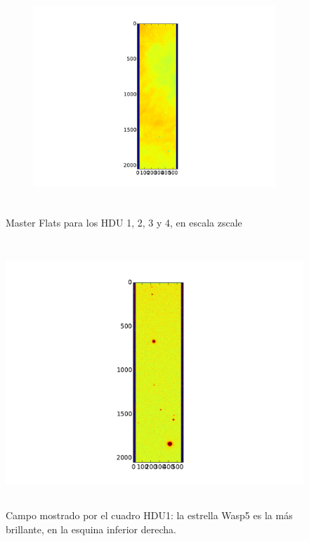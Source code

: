 \documentclass[a4paper, 11pt, spanish]{article}
\begin{document}
\begin{figure}[!ht]
\begin{subfigure}{.5\textwidth}
  \caption{}
  \label{fig:flat3}
\end{subfigure}%
\begin{subfigure}{.5\textwidth}
  \centering
  \includegraphics[width=10cm, height=8cm]{img/flats 4.pdf}
  \caption{}
  \label{fig:flat4}
\end{subfigure}
\caption{Master Flats para los HDU 1, 2, 3 y 4, en escala zscale}
\label{fig:flats}
\end{figure}


\begin{figure}[!htbp]
	\centering
	\includegraphics[height=10cm]{img/campo1.pdf}
	\caption{Campo mostrado por el cuadro HDU1: la estrella Wasp5 es la m\'as brillante, en la esquina inferior derecha.}
	\label{fig:campo}
\end{figure}
\end{document}

